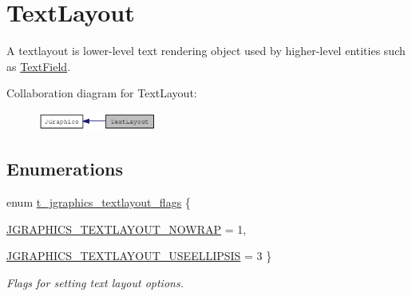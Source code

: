 \hypertarget{group__textlayout}{
\section{TextLayout}
\label{group__textlayout}
}


A textlayout is lower-\/level text rendering object used by higher-\/level entities such as \hyperlink{group__textfield}{TextField}.  


Collaboration diagram for TextLayout:\nopagebreak
\begin{figure}[H]
\begin{center}
\leavevmode
\includegraphics[width=111pt]{group__textlayout}
\end{center}
\end{figure}
\subsection*{Enumerations}
\begin{DoxyCompactItemize}
\item 
enum \hyperlink{group__textlayout_ga9b00aebce7fb7877e7e4c13e18b38f08}{t\_\-jgraphics\_\-textlayout\_\-flags} \{ \par
\hyperlink{group__textlayout_gga9b00aebce7fb7877e7e4c13e18b38f08a2e017ab0c3bba7f02373f6621bee41e8}{JGRAPHICS\_\-TEXTLAYOUT\_\-NOWRAP} =  1, 
\par
\hyperlink{group__textlayout_gga9b00aebce7fb7877e7e4c13e18b38f08a0c76c7621cdb18e19d7ef767e8b71fe5}{JGRAPHICS\_\-TEXTLAYOUT\_\-USEELLIPSIS} =  3
 \}
\begin{DoxyCompactList}\small\item\em Flags for setting text layout options. \item\end{DoxyCompactList}\end{DoxyCompactItemize}
